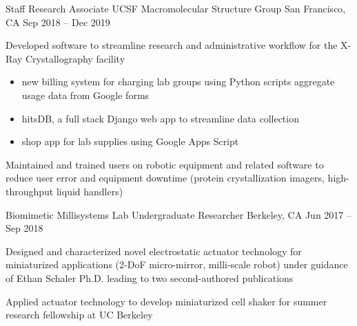 \begin{cventries}
  \cventry
    {Staff Research Associate}
    {UCSF Macromolecular Structure Group}
    {San Francisco, CA}
    {Sep 2018 – Dec 2019}
    {
      \begin{cvitems}
        \item {Developed software to streamline research and administrative workflow for the X-Ray Crystallography facility
            \begin{itemize}
                \item new billing system for charging lab groups using Python scripts aggregate usage data from Google forms
                \item hitsDB, a full stack Django web app to streamline data collection
                \item shop app for lab supplies using Google Apps Script
            \end{itemize}
        }
        \item {Maintained and trained users on robotic equipment and related software to reduce user error and equipment downtime (protein crystallization imagers, high-throughput liquid handlers)}
      \end{cvitems}
    }
  \cventry
    {Biomimetic Millisystems Lab}
    {Undergraduate Researcher}
    {Berkeley, CA}
    {Jun 2017 – Sep 2018}
    {
      \begin{cvitems}
        \item {Designed and characterized novel electrostatic actuator technology for miniaturized applications (2-DoF micro-mirror, milli-scale robot) under guidance of Ethan Schaler Ph.D. leading to two second-authored publications}
        \item {Applied actuator technology to develop miniaturized cell shaker for summer research fellowship at UC Berkeley}
      \end{cvitems}
    }
\end{cventries}
